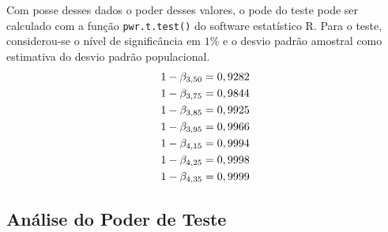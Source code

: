 	Com posse desses dados o poder desses valores, o pode do teste pode ser
	calculado com a função \texttt{pwr.t.test()} do software estatístico R.	Para o
	teste, considerou-se o nível de significância em $1\%$ e o desvio padrão
	amostral como estimativa do desvio padrão populacional.
	\begin{align*}
		1 - \beta_{3,50} &= 0,9282\\
		1 - \beta_{3,75} &= 0,9844\\
		1 - \beta_{3,85} &= 0,9925\\
		1 - \beta_{3,95} &= 0,9966\\
		1 - \beta_{4,15} &= 0,9994\\
		1 - \beta_{4,25} &= 0,9998\\
		1 - \beta_{4,35} &= 0,9999\\
	\end{align*}

\subsection{Análise do Poder de Teste}

